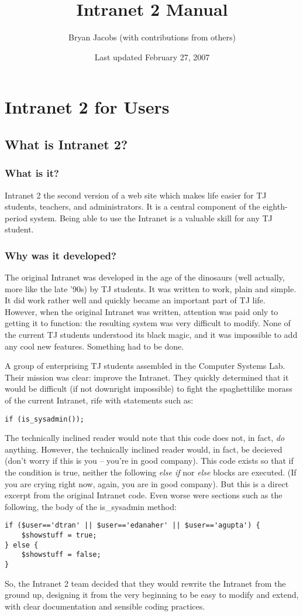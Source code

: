 \documentclass[11pt,letterpaper]{report}
\author{Bryan Jacobs (with contributions from others)}
\title{Intranet 2 Manual}
\date{Last updated February 27, 2007}
\begin{document}
\maketitle
\tableofcontents
\chapter{Intranet 2 for Users}
\section{What is Intranet 2?}
\subsection{What is it?}
Intranet 2 the second version of a web site which makes life easier for TJ students, teachers, and administrators.  
It is a central component of the eighth-period system.  Being able to use the Intranet is a valuable
skill for any TJ student.
\subsection{Why was it developed?}
The original Intranet was developed in the age of the dinosaurs (well actually, more like the late '90s) by TJ students.
It was written to work, plain and simple.  It did work rather well and quickly became an important part of TJ life.
However, when the original Intranet was written, attention was paid only to getting it to function: the resulting system
was very difficult to modify.  None of the current TJ students understood its black magic, and it was impossible to add
any cool new features.  Something had to be done.

A group of enterprising TJ students assembled in the Computer Systems Lab.  Their mission was clear: improve the Intranet.
They quickly determined that it would be difficult (if not downright impossible) to fight the spaghettilike morass of the
current Intranet, rife with statements such as:
\begin{lstlisting}
if (is_sysadmin());
\end{lstlisting}
The technically inclined reader would note that this code does not, in fact, \emph{do} anything.
However, the technically inclined reader would, in fact, be decieved (don't worry if this is you -- you're in
good company). This code exists so that if the condition is true,
neither the following \emph{else if} nor \emph{else} blocks are executed.
(If you are crying right now, again, you are in good company).
But this is a direct excerpt from the original Intranet code.
Even worse were sections such as the following, the body of the is\_sysadmin method:
\begin{lstlisting}
if ($user=='dtran' || $user=='edanaher' || $user=='agupta') {
	$showstuff = true;
} else {
	$showstuff = false;
}
\end{lstlisting}
So, the Intranet 2 team decided that they would rewrite the Intranet from the ground up, designing it from the very beginning
to be easy to modify and extend, with clear documentation and sensible coding practices.
\end{document}
